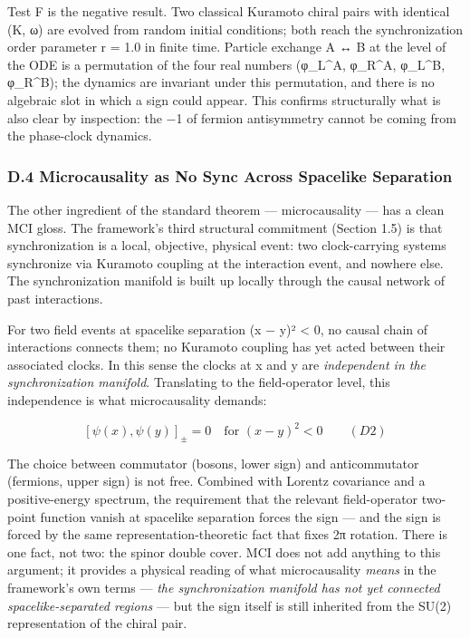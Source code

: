 \documentclass[
]{article}
\begin{document}
Test F is the negative result. Two classical Kuramoto chiral pairs with
identical (K, ω) are evolved from random initial conditions; both reach
the synchronization order parameter \textbar r\textbar{} = 1.0 in finite
time. Particle exchange A ↔ B at the level of the ODE is a permutation
of the four real numbers (φ\_L\^{}A, φ\_R\^{}A, φ\_L\^{}B, φ\_R\^{}B);
the dynamics are invariant under this permutation, and there is no
algebraic slot in which a sign could appear. This confirms structurally
what is also clear by inspection: the −1 of fermion antisymmetry cannot
be coming from the phase-clock dynamics.

\subsubsection{D.4 Microcausality as No Sync Across Spacelike
Separation}\label{d.4-microcausality-as-no-sync-across-spacelike-separation}

The other ingredient of the standard theorem --- microcausality --- has
a clean MCI gloss. The framework's third structural commitment (Section
1.5) is that synchronization is a local, objective, physical event: two
clock-carrying systems synchronize via Kuramoto coupling at the
interaction event, and nowhere else. The synchronization manifold is
built up locally through the causal network of past interactions.

For two field events at spacelike separation (x − y)² \textless{} 0, no
causal chain of interactions connects them; no Kuramoto coupling has yet
acted between their associated clocks. In this sense the clocks at x and
y are \emph{independent in the synchronization manifold}. Translating to
the field-operator level, this independence is what microcausality
demands:

\[[\psi(x), \psi(y)]_\pm = 0 \quad \text{for } (x-y)^2 < 0 \qquad (D2)\]

The choice between commutator (bosons, lower sign) and anticommutator
(fermions, upper sign) is not free. Combined with Lorentz covariance and
a positive-energy spectrum, the requirement that the relevant
field-operator two-point function vanish at spacelike separation forces
the sign --- and the sign is forced by the same representation-theoretic
fact that fixes 2π rotation. There is one fact, not two: the spinor
double cover. MCI does not add anything to this argument; it provides a
physical reading of what microcausality \emph{means} in the framework's
own terms --- \emph{the synchronization manifold has not yet connected
spacelike-separated regions} --- but the sign itself is still inherited
from the SU(2) representation of the chiral pair.
\end{document}

